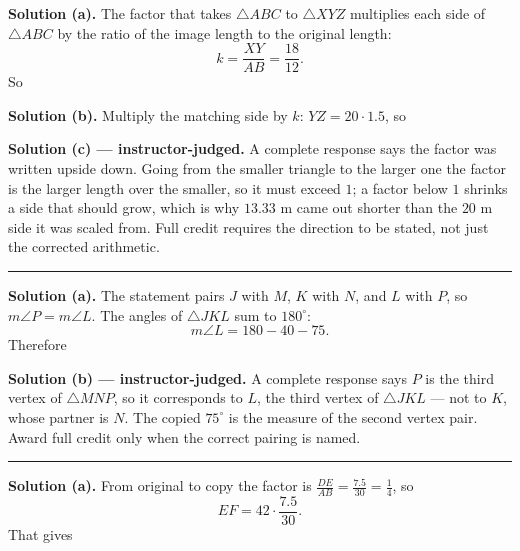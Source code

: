 \documentclass[12pt]{article}
\begin{document}
\noindent\textbf{Solution (a).} The factor that takes $\triangle ABC$ to
$\triangle XYZ$ multiplies each side of $\triangle ABC$ by the ratio of the
image length to the original length:
\[ k = \frac{XY}{AB} = \frac{18}{12}. \]
So 

\noindent\textbf{Solution (b).} Multiply the matching side by $k$:
$YZ = 20 \cdot 1.5$, so 

\noindent\textbf{Solution (c) --- instructor-judged.} A complete response says
the factor was written upside down. Going from the smaller triangle to the
larger one the factor is the larger length over the smaller, so it must exceed
$1$; a factor below $1$ shrinks a side that should grow, which is why $13.33$ m
came out shorter than the $20$ m side it was scaled from. Full credit requires
the direction to be stated, not just the corrected arithmetic.

\vspace{0.2cm}\noindent\rule{\linewidth}{0.2pt}


\noindent\textbf{Solution (a).} The statement pairs $J$ with $M$, $K$ with $N$,
and $L$ with $P$, so $m\angle P = m\angle L$. The angles of $\triangle JKL$ sum
to $180^\circ$:
\[ m\angle L = 180 - 40 - 75 . \]
Therefore 

\noindent\textbf{Solution (b) --- instructor-judged.} A complete response says
$P$ is the third vertex of $\triangle MNP$, so it corresponds to $L$, the third
vertex of $\triangle JKL$ --- not to $K$, whose partner is $N$. The copied
$75^\circ$ is the measure of the second vertex pair. Award full credit only when
the correct pairing is named.

\vspace{0.2cm}\noindent\rule{\linewidth}{0.2pt}


\noindent\textbf{Solution (a).} From original to copy the factor is
$\frac{DE}{AB} = \frac{7.5}{30} = \frac{1}{4}$, so
\[ EF = 42 \cdot \frac{7.5}{30} . \]
That gives 
\end{document}

